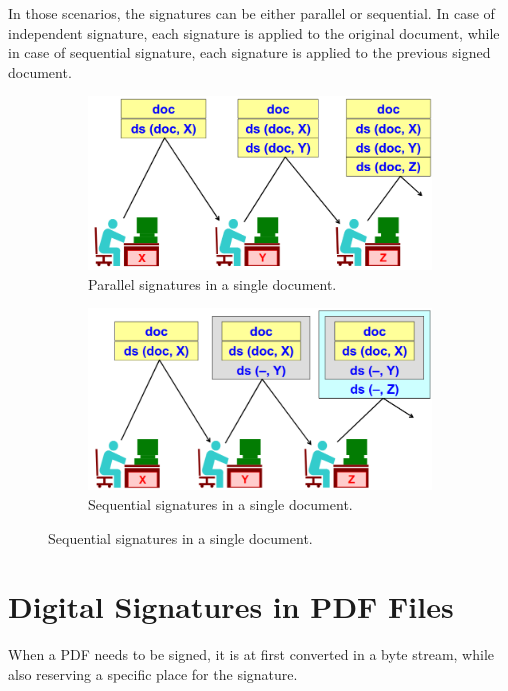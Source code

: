 In those scenarios, the signatures can be either parallel or
sequential. In case of independent signature, each signature is applied
to the original document, while in case of sequential signature, each 
signature is applied to the previous signed document.
\begin{figure}[H]
  \centering
  \begin{subfigure}[b]{0.45\textwidth}
    \includegraphics[width=\textwidth]{img/paralledl signatures.png}
    \caption{Parallel signatures in a single document.}
  \end{subfigure}
  \hfill
  \begin{subfigure}[b]{0.45\textwidth}
    \includegraphics[width=\textwidth]{img/sequential signatures.png}
    \caption{Sequential signatures in a single document.}
  \end{subfigure}
\end{figure}

\section{Digital Signatures in PDF Files}

When a PDF needs to be signed, it is at first converted in a byte
stream, while also reserving a specific place for the signature.

